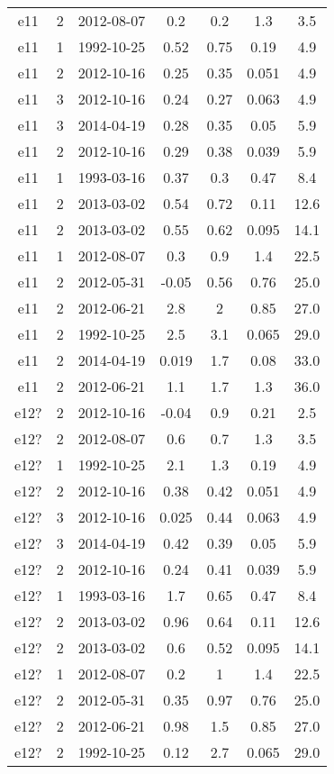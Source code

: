 \begin{table*}[htp]
\begin{tabular}{ccccccc}
e11 & 2 & 2012-08-07 & 0.2 & 0.2 & 1.3 & 3.5 \\
e11 & 1 & 1992-10-25 & 0.52 & 0.75 & 0.19 & 4.9 \\
e11 & 2 & 2012-10-16 & 0.25 & 0.35 & 0.051 & 4.9 \\
e11 & 3 & 2012-10-16 & 0.24 & 0.27 & 0.063 & 4.9 \\
e11 & 3 & 2014-04-19 & 0.28 & 0.35 & 0.05 & 5.9 \\
e11 & 2 & 2012-10-16 & 0.29 & 0.38 & 0.039 & 5.9 \\
e11 & 1 & 1993-03-16 & 0.37 & 0.3 & 0.47 & 8.4 \\
e11 & 2 & 2013-03-02 & 0.54 & 0.72 & 0.11 & 12.6 \\
e11 & 2 & 2013-03-02 & 0.55 & 0.62 & 0.095 & 14.1 \\
e11 & 1 & 2012-08-07 & 0.3 & 0.9 & 1.4 & 22.5 \\
e11 & 2 & 2012-05-31 & -0.05 & 0.56 & 0.76 & 25.0 \\
e11 & 2 & 2012-06-21 & 2.8 & 2 & 0.85 & 27.0 \\
e11 & 2 & 1992-10-25 & 2.5 & 3.1 & 0.065 & 29.0 \\
e11 & 2 & 2014-04-19 & 0.019 & 1.7 & 0.08 & 33.0 \\
e11 & 2 & 2012-06-21 & 1.1 & 1.7 & 1.3 & 36.0 \\
e12? & 2 & 2012-10-16 & -0.04 & 0.9 & 0.21 & 2.5 \\
e12? & 2 & 2012-08-07 & 0.6 & 0.7 & 1.3 & 3.5 \\
e12? & 1 & 1992-10-25 & 2.1 & 1.3 & 0.19 & 4.9 \\
e12? & 2 & 2012-10-16 & 0.38 & 0.42 & 0.051 & 4.9 \\
e12? & 3 & 2012-10-16 & 0.025 & 0.44 & 0.063 & 4.9 \\
e12? & 3 & 2014-04-19 & 0.42 & 0.39 & 0.05 & 5.9 \\
e12? & 2 & 2012-10-16 & 0.24 & 0.41 & 0.039 & 5.9 \\
e12? & 1 & 1993-03-16 & 1.7 & 0.65 & 0.47 & 8.4 \\
e12? & 2 & 2013-03-02 & 0.96 & 0.64 & 0.11 & 12.6 \\
e12? & 2 & 2013-03-02 & 0.6 & 0.52 & 0.095 & 14.1 \\
e12? & 1 & 2012-08-07 & 0.2 & 1 & 1.4 & 22.5 \\
e12? & 2 & 2012-05-31 & 0.35 & 0.97 & 0.76 & 25.0 \\
e12? & 2 & 2012-06-21 & 0.98 & 1.5 & 0.85 & 27.0 \\
e12? & 2 & 1992-10-25 & 0.12 & 2.7 & 0.065 & 29.0 \\

\end{tabular}
\end{table*}
